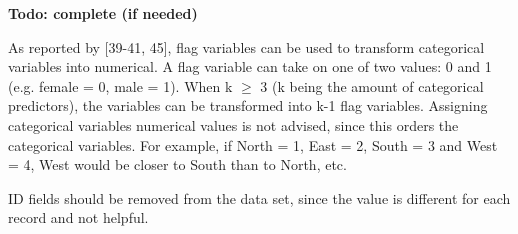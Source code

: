 \textbf{Todo: complete (if needed)}

As reported by \textcite{DataMiningAndPredictiveAnalytics}[39-41, 45], flag variables can be used to transform categorical variables into numerical. A flag variable can take on one of two values: 0 and 1 (e.g. female = 0, male = 1). When k $\geq$ 3 (k being the amount of categorical predictors), the variables can be transformed into k-1 flag variables. Assigning categorical variables numerical values is not advised, since this orders the categorical variables. For example, if North = 1, East = 2, South = 3 and West = 4, West would be closer to South than to North, etc.


ID fields should be removed from the data set, since the value is different for each record and not helpful.




